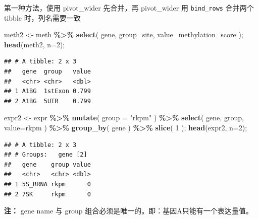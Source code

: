 \documentclass[ignorenonframetext,]{beamer}
\newenvironment{Shaded}{\begin{snugshade}}{\end{snugshade}}
\newcommand{\AttributeTok}[1]{\textcolor[rgb]{0.13,0.29,0.53}{#1}}
\newcommand{\DecValTok}[1]{\textcolor[rgb]{0.00,0.00,0.81}{#1}}
\newcommand{\FunctionTok}[1]{\textcolor[rgb]{0.13,0.29,0.53}{\textbf{#1}}}
\newcommand{\NormalTok}[1]{#1}
\newcommand{\OtherTok}[1]{\textcolor[rgb]{0.56,0.35,0.01}{#1}}
\newcommand{\SpecialCharTok}[1]{\textcolor[rgb]{0.81,0.36,0.00}{\textbf{#1}}}
\newcommand{\StringTok}[1]{\textcolor[rgb]{0.31,0.60,0.02}{#1}}
\newcommand\FontSmall{\fontsize{7}{8}\selectfont}
\newcommand\FontNormal{\fontsize{10}{10}\selectfont}
\begin{document}
\begin{frame}[fragile]{第一种方法，使用 pivot\_wider}
\protect\hypertarget{ux7b2cux4e00ux79cdux65b9ux6cd5ux4f7fux7528-pivot_wider}{}
先合并，再 pivot\_wider 用 \texttt{bind\_rows} 合并两个 tibble
时，列名需要一致

\FontSmall

\begin{Shaded}
\begin{Highlighting}[]
\NormalTok{meth2 }\OtherTok{\textless{}{-}}\NormalTok{ meth }\SpecialCharTok{\%\textgreater{}\%} \FunctionTok{select}\NormalTok{( gene, }\AttributeTok{group=}\NormalTok{site, }\AttributeTok{value=}\NormalTok{methylation\_score );}
\FunctionTok{head}\NormalTok{(meth2, }\AttributeTok{n=}\DecValTok{2}\NormalTok{);}
\end{Highlighting}
\end{Shaded}

\begin{verbatim}
## # A tibble: 2 x 3
##   gene  group   value
##   <chr> <chr>   <dbl>
## 1 A1BG  1stExon 0.799
## 2 A1BG  5UTR    0.799
\end{verbatim}

\begin{Shaded}
\begin{Highlighting}[]
\NormalTok{expr2 }\OtherTok{\textless{}{-}}\NormalTok{ expr }\SpecialCharTok{\%\textgreater{}\%} \FunctionTok{mutate}\NormalTok{( }\AttributeTok{group =} \StringTok{"rkpm"}\NormalTok{ ) }\SpecialCharTok{\%\textgreater{}\%}
  \FunctionTok{select}\NormalTok{( gene, group, }\AttributeTok{value=}\NormalTok{rkpm ) }\SpecialCharTok{\%\textgreater{}\%} 
  \FunctionTok{group\_by}\NormalTok{( gene ) }\SpecialCharTok{\%\textgreater{}\%} \FunctionTok{slice}\NormalTok{( }\DecValTok{1}\NormalTok{ );}
\FunctionTok{head}\NormalTok{(expr2, }\AttributeTok{n=}\DecValTok{2}\NormalTok{);}
\end{Highlighting}
\end{Shaded}

\begin{verbatim}
## # A tibble: 2 x 3
## # Groups:   gene [2]
##   gene    group value
##   <chr>   <chr> <dbl>
## 1 5S_RRNA rkpm      0
## 2 7SK     rkpm      0
\end{verbatim}

\FontNormal

\textbf{注：} gene name 与 group
组合必须是唯一的。即：基因A只能有一个表达量值。
\end{frame}
\end{document}
